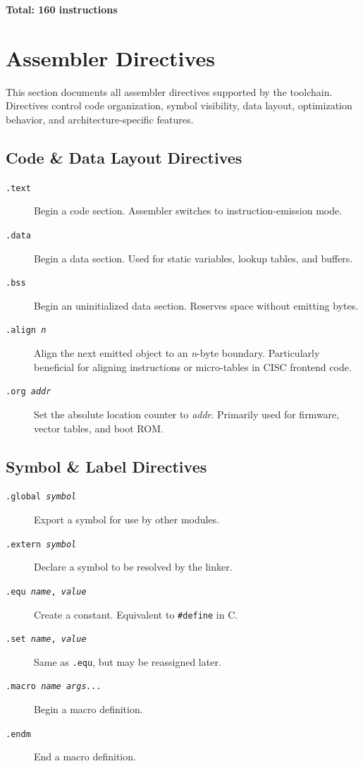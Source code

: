 \documentclass[12pt]{article}
\begin{document}
\textbf{Total: 160 instructions}

\section{Assembler Directives}

This section documents all assembler directives supported by the toolchain. Directives control code organization, symbol visibility, data layout, optimization behavior, and architecture-specific features.

\subsection{Code \& Data Layout Directives}

\begin{description}
\item[\texttt{.text}] Begin a code section. Assembler switches to instruction-emission mode.

\item[\texttt{.data}] Begin a data section. Used for static variables, lookup tables, and buffers.

\item[\texttt{.bss}] Begin an uninitialized data section. Reserves space without emitting bytes.

\item[\texttt{.align \textit{n}}] Align the next emitted object to an \textit{n}-byte boundary. Particularly beneficial for aligning instructions or micro-tables in CISC frontend code.

\item[\texttt{.org \textit{addr}}] Set the absolute location counter to \textit{addr}. Primarily used for firmware, vector tables, and boot ROM.
\end{description}

\subsection{Symbol \& Label Directives}

\begin{description}
\item[\texttt{.global \textit{symbol}}] Export a symbol for use by other modules.

\item[\texttt{.extern \textit{symbol}}] Declare a symbol to be resolved by the linker.

\item[\texttt{.equ \textit{name}, \textit{value}}] Create a constant. Equivalent to \texttt{\#define} in C.

\item[\texttt{.set \textit{name}, \textit{value}}] Same as \texttt{.equ}, but may be reassigned later.

\item[\texttt{.macro \textit{name} \textit{args...}}] Begin a macro definition.

\item[\texttt{.endm}] End a macro definition.
\end{description}
\end{document}
